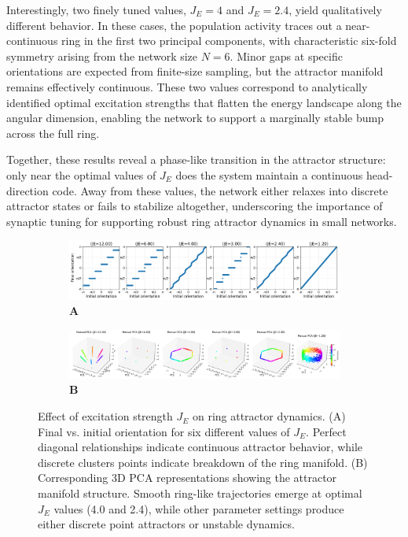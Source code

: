 \documentclass[11pt,a4paper]{article}
\begin{document}
Interestingly, two finely tuned values, \( J_E = 4 \) and \( J_E = 2.4 \), yield qualitatively different behavior. 
In these cases, the population activity traces out a near-continuous ring in the first two principal components, with characteristic six-fold symmetry arising from the network size \( N = 6 \). 
Minor gaps at specific orientations are expected from finite-size sampling, but the attractor manifold remains effectively continuous. 
These two values correspond to analytically identified optimal excitation strengths that flatten the energy landscape along the angular dimension, enabling the network to support a marginally stable bump across the full ring.

Together, these results reveal a phase-like transition in the attractor structure: only near the optimal values of \( J_E \) does the system maintain a continuous head-direction code. 
Away from these values, the network either relaxes into discrete attractor states or fails to stabilize altogether, underscoring the importance of synaptic tuning for supporting robust ring attractor dynamics in small networks.

\begin{figure}[H]
\centering
\begin{subfigure}{\textwidth}
    \centering
    \caption*{\textbf{A}}
    \includegraphics[width=\textwidth]{orientation_comparison_without_v.png}
\end{subfigure}

\vspace{0.1cm}

\begin{subfigure}{\textwidth}
    \centering
    \caption*{\textbf{B}}
    \includegraphics[width=\textwidth]{manual_pca_without_v.png}
\end{subfigure}

\caption{Effect of excitation strength \( J_E \) on ring attractor dynamics. (A) Final vs. initial orientation for six different values of \( J_E \). Perfect diagonal relationships indicate continuous attractor behavior, while discrete clusters points indicate breakdown of the ring manifold. 
(B) Corresponding 3D PCA representations showing the attractor manifold structure. Smooth ring-like trajectories emerge at optimal \( J_E \) values (4.0 and 2.4), while other parameter settings produce either discrete point attractors or unstable dynamics.}
\label{fig:je_parameter_sweep}
\end{figure}
\end{document}
